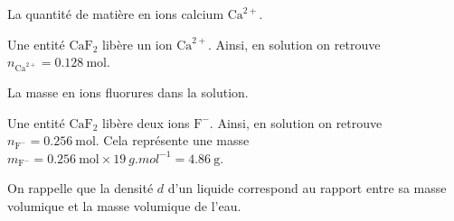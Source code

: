 \begin{enonce}
La quantité de matière en ions calcium $\textrm{Ca}^{2+}$.
\end{enonce}


\begin{corrige}
Une entité $\textrm{Ca}\textrm{F}_2$ libère un ion $\textrm{Ca}^{2+}$. Ainsi, en solution on retrouve $n_{\textrm{Ca}^{2+}}=\SI{0,128}{\mol}$.
\end{corrige}




\begin{enonce}
La masse en ions fluorures dans la solution.
\end{enonce}


\begin{corrige}
Une entité $\textrm{Ca}\textrm{F}_2$ libère deux ions $\textrm{F}^-$. Ainsi, en solution on retrouve $n_{\textrm{F}^-}=\SI{0,256}{\mol}$. Cela  représente une masse $m_{\textrm{F}^-}=\SI{0,256}{\mol}\times\SI{19}{g.mol^{-1}}=\SI{4,86}{\gram}$.
\end{corrige}


\finEntrainement




\newpage







\bigskip


\begin{prerequis}%
On rappelle que la densité $d$ d'un liquide correspond au rapport entre sa masse volumique et la masse volumique de l'eau. 
\end{prerequis}




